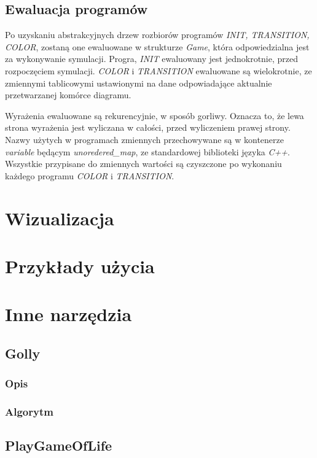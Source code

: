 \documentclass[declaration,shortabstract, inz]{iithesis}
\theoremstyle{definition} \newtheorem{definition}{Definicja}[]
\theoremstyle{plain} \newtheorem{remark}[definition]{Obserwacja}
\theoremstyle{plain} \newtheorem{theorem}[definition]{Twierdzenie}
\theoremstyle{plain} \newtheorem{example}{Przykład}[definition]
\theoremstyle{plain} \newtheorem{lemma}[definition]{Lemat}
\begin{document}
\section{Ewaluacja programów}
Po uzyskaniu abstrakcyjnych drzew rozbiorów programów \textit{INIT, TRANSITION, COLOR}, zostaną one ewaluowane w strukturze \textit{Game}, która odpowiedzialna jest za wykonywanie symulacji. Progra, \textit{INIT} ewaluowany jest jednokrotnie, przed rozpoczęciem symulacji. \textit{COLOR} i \textit{TRANSITION} ewaluowane są wielokrotnie, ze zmiennymi tablicowymi ustawionymi na dane odpowiadające aktualnie przetwarzanej komórce diagramu. 

Wyrażenia ewaluowane są rekurencyjnie, w sposób gorliwy. Oznacza to, że lewa strona wyrażenia jest wyliczana w całości, przed wyliczeniem prawej strony. Nazwy użytych w programach zmiennych przechowywane są w kontenerze \textit{variable} będącym \textit{unoredered\_map}, ze standardowej biblioteki języka \textit{C++}. Wszystkie przypisane do zmiennych wartości są czyszczone po wykonaniu każdego programu \textit{COLOR} i \textit{TRANSITION}.

\chapter{Wizualizacja}

\chapter{Przykłady użycia}
\chapter{Inne narzędzia}
\section{Golly}
\subsection{Opis}
\subsection{Algorytm}
\section{PlayGameOfLife}



\end{document}
